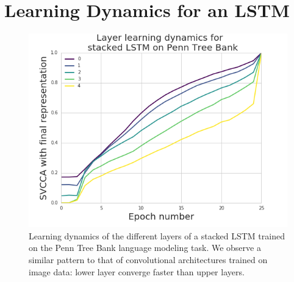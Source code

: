 \documentclass{article} %
\begin{document}
 \section{Learning Dynamics for an LSTM}\label{sec:LSTM}

\begin{figure}[ht]
   \centering
   \hspace*{-1.5cm}
   \includegraphics[width=0.5\columnwidth]{figures/LSTM_Learning_dynamics_plot.png}
   \caption{Learning dynamics of the different layers of a stacked LSTM trained on the Penn Tree Bank language modeling task. We observe a similar pattern to that of convolutional architectures trained on image data: lower layer converge faster than upper layers. }
   \label{fig-SVCCA-LSTM}
   \vspace*{-0.9em}
 \end{figure}
\end{document}
